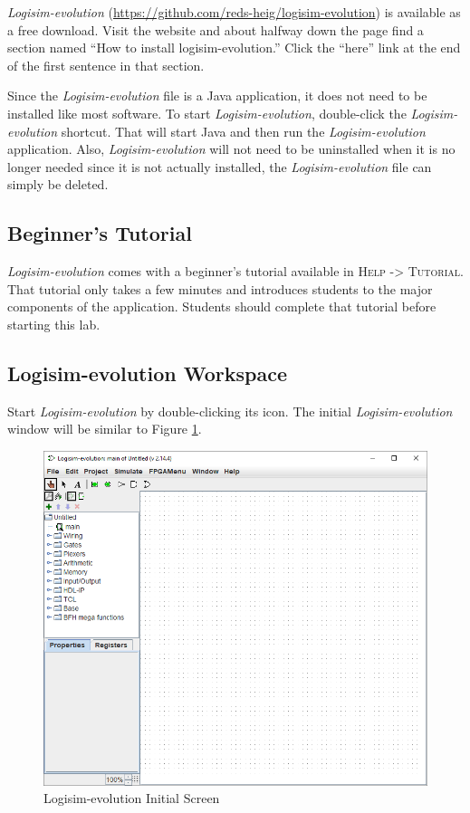 \textit{Logisim-evolution} (\url{https://github.com/reds-heig/logisim-evolution}) is available as a free download. Visit the website and about halfway down the page find a section named ``How to install logisim-evolution.'' Click the ``here'' link at the end of the first sentence in that section. 

Since the \textit{Logisim-evolution} file is a Java application, it does not need to be installed like most software. To start \textit{Logisim-evolution}, double-click the \textit{Logisim-evolution} shortcut. That will start Java and then run the \textit{Logisim-evolution} application. Also, \textit{Logisim-evolution} will not need to be uninstalled when it is no longer needed since it is not actually installed, the \textit{Logisim-evolution} file can simply be deleted.

\subsection{Beginner's Tutorial}

\textit{Logisim-evolution} comes with a beginner's tutorial available in \textsc{Help -> Tutorial}. That tutorial only takes a few minutes and introduces students to the major components of the application. Students should complete that tutorial before starting this lab.

\subsection{Logisim-evolution Workspace}

Start \textit{Logisim-evolution} by double-clicking its icon. The initial \textit{Logisim-evolution} window will be similar to Figure \ref{fig:01-01}.

\begin{figure}[H]
	\centering
	\includegraphics[width=\maxwidth{.95\linewidth}]{gfx/01-01}
	\caption{Logisim-evolution Initial Screen}
	\label{fig:01-01}
\end{figure}

